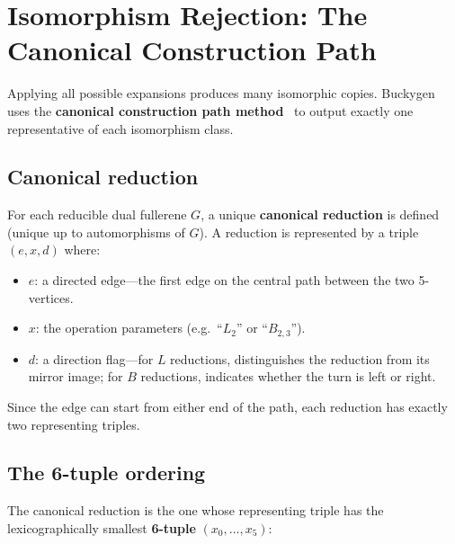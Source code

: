 \documentclass[11pt,a4paper]{article}
\theoremstyle{definition}
\begin{document}
\section{Isomorphism Rejection: The Canonical Construction Path}
\label{sec:canonicity}

Applying all possible expansions produces many isomorphic copies.
Buckygen uses the \textbf{canonical construction path
method}~\cite{mckay_98} to output exactly one representative of each
isomorphism class.

\subsection{Canonical reduction}

For each reducible dual fullerene $G$, a unique \textbf{canonical
reduction} is defined (unique up to automorphisms of $G$).  A reduction
is represented by a triple $(e, x, d)$ where:
\begin{itemize}[nosep]
  \item $e$: a directed edge---the first edge on the central path
    between the two 5-vertices.
  \item $x$: the operation parameters (e.g.\ ``$L_2$'' or ``$B_{2,3}$'').
  \item $d$: a direction flag---for $L$ reductions, distinguishes
    the reduction from its mirror image; for $B$ reductions, indicates
    whether the turn is left or right.
\end{itemize}
Since the edge can start from either end of the path, each reduction
has exactly two representing triples.

\subsection{The 6-tuple ordering}

The canonical reduction is the one whose representing triple has the
lexicographically smallest \textbf{6-tuple} $(x_0, \ldots, x_5)$:
\end{document}
